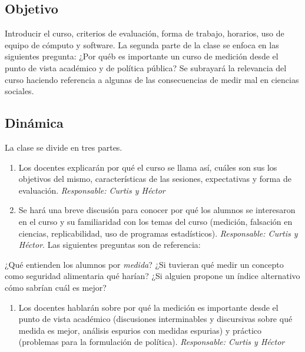 \documentclass[11pt,]{article}
\providecommand{\tightlist}{%
  \setlength{\itemsep}{0pt}\setlength{\parskip}{0pt}}
\begin{document}
\hypertarget{objetivo}{%
\subsection{Objetivo}\label{objetivo}}

Introducir el curso, criterios de evaluación, forma de trabajo,
horarios, uso de equipo de cómputo y software. La segunda parte de la
clase se enfoca en las siguientes pregunta: ¿Por québ es importante un
curso de medición desde el punto de vista académico y de política
pública? Se subrayará la relevancia del curso haciendo referencia a
algunas de las consecuencias de medir mal en ciencias sociales.

\hypertarget{dinamica}{%
\subsection{Dinámica}\label{dinamica}}

La clase se divide en tres partes.

\begin{enumerate}
\def\labelenumi{\arabic{enumi}.}
\item
  Los docentes explicarán por qué el curso se llama así, cuáles son sus
  los objetivos del mismo, características de las sesiones, expectativas
  y forma de evaluación. \emph{Responsable: Curtis y Héctor}
\item
  Se hará una breve discusión para conocer por qué los alumnos se
  interesaron en el curso y su familiaridad con los temas del curso
  (medición, falsación en ciencias, replicabilidad, uso de programas
  estadísticos). \emph{Responsable: Curtis y Héctor}. Las siguientes
  preguntas son de referencia:
\end{enumerate}

¿Qué entienden los alumnos por \emph{medida}? ¿Si tuvieran qué medir un
concepto como seguridad alimentaria qué harían? ¿Si alguien propone un
índice alternativo cómo sabrían cuál es mejor?

\begin{enumerate}
\def\labelenumi{\arabic{enumi}.}
\setcounter{enumi}{2}
\tightlist
\item
  Los docentes hablarán sobre por qué la medición es importante desde el
  punto de vista académico (discusiones interminables y discursivas
  sobre qué medida es mejor, análisis espurios con medidas espurias) y
  práctico (problemas para la formulación de política).
  \emph{Responsable: Curtis y Héctor}
\end{enumerate}
\end{document}
